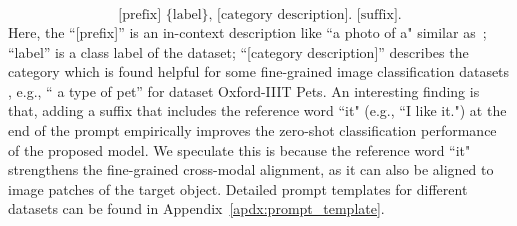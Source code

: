 \vspace{-3mm}
\begin{equation}
\text{[prefix] \{label\}, [category description]. [suffix].} \label{eq:prompt_template}
\end{equation}
Here, the ``[prefix]'' is an in-context description like ``a photo of a" similar as~\cite{radford2021learning};
``{label}'' is a class label of the dataset;
``[category description]'' describes the category which is found helpful for some fine-grained image classification datasets \citep{radford2021learning}, e.g.,  `` a type of pet'' for dataset Oxford-IIIT Pets.
An interesting finding is that,
adding a suffix that includes the reference word ``it" (e.g., ``I like it.") at the end of the prompt empirically improves the zero-shot classification performance of the proposed model.
We speculate this is because the reference word ``it" strengthens the fine-grained cross-modal alignment, as it
can also be aligned to image patches of the target object. Detailed prompt templates  for different datasets can be found in Appendix~\ref{apdx:prompt_template}.



